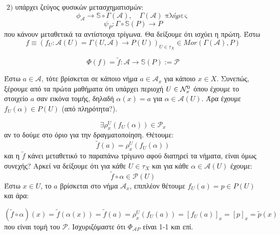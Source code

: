 $ $\newline
$2)$ υπάρχει ζεύγος φυσικών μετασχηματισμών:
$$\phi_{\mathcal{A}} \longrightarrow \mathbb{S}\circ \Gamma(\mathcal{A}), \quad \Gamma(\mathcal{A}) \text{ πλήρες }$$
$$\psi_{P}: \Gamma \circ \mathbb{S}(P) \longrightarrow P$$ που κάνουν μεταθετικά τα αντίστοιχα τρίγωνα. Θα δείξουμε ότι ισχύει η πρώτη. Έστω
$$f\equiv (f_U: \mathcal{A}(U) = \Gamma(U,\mathcal{A})\longrightarrow P(U))_{U\in\tau_X} \in Mor(\Gamma(\mathcal{A}),P)$$

$$\Phi(f) = \tilde{f}:\mathcal{A} \longrightarrow \mathbb{S}(P) := \mathcal{P}$$
\begin{figure}[H]
    \centering
\end{figure}

\noindent Έστω $a \in \mathcal{A}$, τότε βρίσκεται σε κάποιο νήμα $a \in \mathcal{A}_x$ για κάποιο $x \in X$. Συνεπώς, ξέρουμε από τα πρώτα μαθήματα ότι υπάρχει περιοχή $U \in \mathcal{N}^0_x$ όπου έχουμε το στοιχείο $a$ σαν εικόνα τομής, δηλαδή $\alpha (x) = a$ για $\alpha \in \mathcal{A}(U)$. Άρα έχουμε $f_U(\alpha) \in P(U)$ (από πληρότητα?).

$$\exists \rho^U_x (f_U(\alpha)) \in \mathcal{P}_x$$ αν το δούμε στο όριο για την δραγματοποίηση. Θέτουμε:
$$\tilde{f}(a) = \rho^U_x(f_U(\alpha))$$ και η $\tilde{f}$ κάνει μεταθετικό το παραπάνω τρίγωνο αφού διατηρεί τα νήματα, είναι όμως συνεχής? Αρκεί να δείξουμε ότι για κάθε $U \in \tau_X$ και για κάθε $\alpha \in \mathcal{A}(U)$ έχουμε:
$$\tilde{f}\circ \alpha \in \mathcal{P}(U)$$ Έστω $x \in U$, το $a$ βρίσκεται στο νήμα $\mathcal{A}_x$, επιπλέον θέτουμε $f_U(a)=p \in P(U)$ και άρα:

$$(\tilde{f}\circ \alpha)(x) = \tilde{f} (\alpha(x)) = \tilde{f}(a) = \rho^U_x(f_U(a)) = [f_U(a)]_x = [p]_x = \tilde{p}(x)$$ που είναι τομή του $\mathcal{P}$. Ισχυριζόμαστε ότι $\Phi_{\mathcal{A}P}$ είναι 1-1 και επί.

